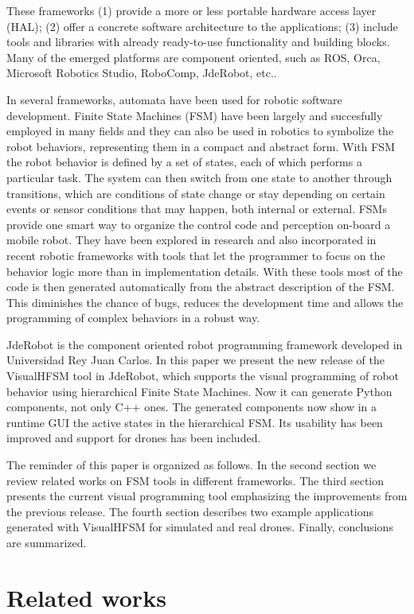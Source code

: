 \documentclass[journal,twoside]{JoPhA}
\begin{document}
These frameworks (1) provide a more or less portable hardware access layer (HAL); (2) offer a concrete software architecture to the applications; (3) include tools and libraries with already ready-to-use functionality and building blocks. Many of the emerged platforms are component oriented, such as ROS, Orca, Microsoft Robotics Studio, RoboComp, JdeRobot, etc..

In several frameworks, automata have been used for robotic software development. Finite State Machines (FSM) have been largely and succesfully employed in many fields and they can also be used in robotics to symbolize the robot behaviors, representing them in a compact and abstract form. With FSM the robot behavior is defined by a set of states, each of which performs a particular task. The system can then switch from one state to another through transitions, which are conditions of state change or stay depending on certain events or sensor conditions that may happen, both internal or external. FSMs provide one smart way to organize the control code and perception on-board a mobile robot. They have been explored in research and also incorporated in recent robotic frameworks with tools that let the programmer to focus on the behavior logic more than in implementation details. With these tools most of the code is then generated automatically from the abstract description of the FSM. This diminishes the chance of bugs, reduces the development time and allows the programming of complex behaviors in a robust way.

JdeRobot is the component oriented robot programming framework developed in Universidad Rey Juan Carlos. In this paper we present the new release of the VisualHFSM tool in JdeRobot, which supports the visual programming of robot behavior using hierarchical Finite State Machines. Now it can generate Python components, not only C++ ones. The generated components now show in a runtime GUI the active states in the hierarchical FSM. Its usability has been improved and support for drones has been included.

The reminder of this paper is organized as follows. In the second section we review related works on FSM tools in different frameworks. The third section presents the current visual programming tool emphasizing the improvements from the previous release. The fourth section describes two example applications generated with VisualHFSM for simulated and real drones. Finally, conclusions are summarized.

\section{Related works}
\end{document}
